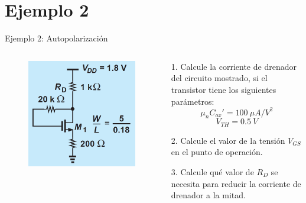 \documentclass[t,aspectratio=169]{beamer}
\begin{document}
\section{Ejemplo 2}
\begin{frame}{Ejemplo 2: Autopolarización}

\begin{columns}

\begin{column}{0.3\textwidth}

\begin{figure}
    \centering
    \includegraphics[width=\textwidth]{figuras/mosfet_ejemplo_2_autopolarizacion.png}
\end{figure}

\end{column}

\begin{column}{0.7\textwidth}

1. Calcule la corriente de drenador del circuito mostrado, si el transistor tiene los siguientes parámetros:
\[\mu_n C_{ox}' = 100\ \mu A/V^2\]
\[ V_{TH}=0.5\ V\]

\vspace{5mm}
2. Calcule el valor de la tensión $V_{GS}$ en el punto de operación.

\vspace{5mm}
3. Calcule qué valor de $R_D$ se necesita para reducir la corriente de drenador a la mitad.
\end{column}

\end{columns}

\end{frame}
\end{document}
